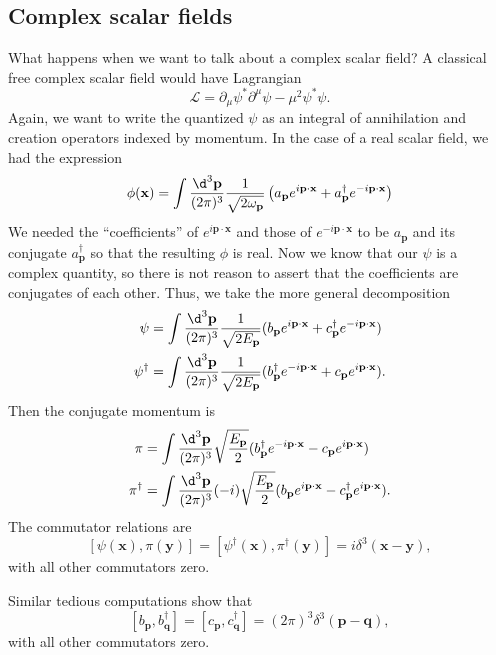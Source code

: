 \documentclass[a4paper]{article}
\begin{document}
\subsection{Complex scalar fields}
What happens when we want to talk about a complex scalar field? A classical free complex scalar field would have Lagrangian
\[
  \mathcal{L} = \partial_\mu \psi^* \partial^\mu \psi - \mu^2 \psi^* \psi.
\]
Again, we want to write the quantized $\psi$ as an integral of annihilation and creation operators indexed by momentum. In the case of a real scalar field, we had the expression
\[
  \phi(\mathbf{x}) = \int \frac{\d^3 \mathbf{p}}{(2\pi)^3} \frac{1}{\sqrt{2 \omega_\mathbf{p}}} \left(a_\mathbf{p} e^{i \mathbf{p} \cdot \mathbf{x}} + a_\mathbf{p}^\dagger e^{-i \mathbf{p}\cdot \mathbf{x}}\right)
\]
We needed the ``coefficients'' of $e^{i\mathbf{p}\cdot \mathbf{x}}$ and those of $e^{-i\mathbf{p}\cdot \mathbf{x}}$ to be $a_\mathbf{p}$ and its conjugate $a_\mathbf{p}^\dagger$ so that the resulting $\phi$ is real. Now we know that our $\psi$ is a complex quantity, so there is not reason to assert that the coefficients are conjugates of each other. Thus, we take the more general decomposition
\begin{align*}
  \psi &= \int \frac{\d^3 \mathbf{p}}{(2\pi)^3}\frac{1}{\sqrt{2 E_\mathbf{p}}}(b_\mathbf{p} e^{i \mathbf{p}\cdot \mathbf{x}} + c_\mathbf{p}^\dagger e^{-i\mathbf{p}\cdot \mathbf{x}})\\
  \psi^\dagger &= \int \frac{\d^3 \mathbf{p}}{(2\pi)^3} \frac{1}{\sqrt{2E_\mathbf{p}}} (b_\mathbf{p}^\dagger e^{-i\mathbf{p}\cdot \mathbf{x}} + c_\mathbf{p} e^{i\mathbf{p}\cdot \mathbf{x}}).
\end{align*}
Then the conjugate momentum is
\begin{align*}
  \pi &= \int \frac{\d^3 \mathbf{p}}{(2\pi)^3} \sqrt{\frac{E_\mathbf{p}}{2}} (b_\mathbf{p}^\dagger e^{-i\mathbf{p}\cdot \mathbf{x}} - c_\mathbf{p}e^{i\mathbf{p}\cdot \mathbf{x}})\\
  \pi^\dagger &= \int \frac{\d^3 \mathbf{p}}{(2\pi)^3}(-i) \sqrt{\frac{E_\mathbf{p}}{2}} (b_\mathbf{p} e^{i\mathbf{p}\cdot \mathbf{x}} - c_\mathbf{p}^\dagger e^{i\mathbf{p}\cdot \mathbf{x}}).
\end{align*}
The commutator relations are
\[
  [\psi(\mathbf{x}), \pi(\mathbf{y})] = [\psi^\dagger(\mathbf{x}), \pi^\dagger(\mathbf{y})] = i \delta^3(\mathbf{x} - \mathbf{y}),
\]
with all other commutators zero.

Similar tedious computations show that
\[
  [b_\mathbf{p}, b_\mathbf{q}^\dagger] = [c_\mathbf{p}, c_\mathbf{q}^\dagger] = (2\pi)^3 \delta^3(\mathbf{p} - \mathbf{q}),
\]
with all other commutators zero.
\end{document}
